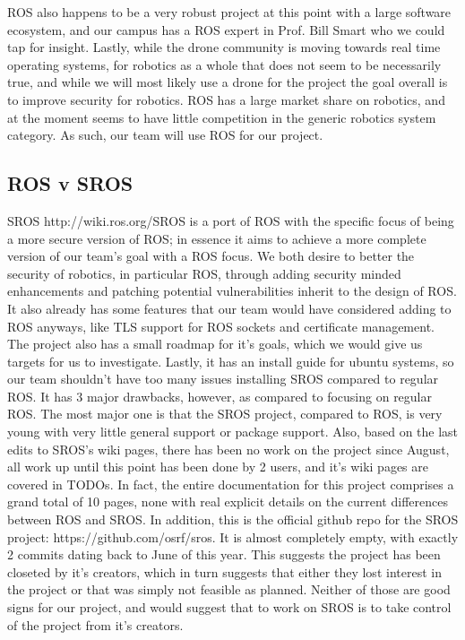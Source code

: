 \documentclass[IEEEtran,letterpaper,10pt,titlepage,draftclsnofoot,onecolumn]{article}
\begin{document}
ROS also happens to be a very robust project at this point with a large software ecosystem, and our campus has a ROS expert in Prof. Bill Smart who we could tap for insight. 
Lastly, while the drone community is moving towards real time operating systems, for robotics as a whole that does not seem to be necessarily true, and while we will most likely use a drone for the project the goal overall is to improve security for robotics. 
ROS has a large market share on robotics, and at the moment seems to have little competition in the generic robotics system category. As such, our team will use ROS for our project.

\subsection*{ROS v SROS}
SROS http://wiki.ros.org/SROS is a port of ROS with the specific focus of being a more secure version of ROS; in essence it aims to achieve a more complete version of our team's goal with a ROS focus. 
We both desire to better the security of robotics, in particular ROS, through adding security minded enhancements and patching potential vulnerabilities inherit to the design of ROS. 
It also already has some features that our team would have considered adding to ROS anyways, like TLS support for ROS sockets and certificate management. 
The project also has a small roadmap for it's goals, which we would give us targets for us to investigate. 
Lastly, it has an install guide for ubuntu systems, so our team shouldn't have too many issues installing SROS compared to regular ROS. 
It has 3 major drawbacks, however, as compared to focusing on regular ROS. 
The most major one is that the SROS project, compared to ROS, is very young with very little general support or package support. 
Also, based on the last edits to SROS's wiki pages, there has been no work on the project since August, all work up until this point has been done by 2 users, and it's wiki pages are covered in TODOs. 
In fact, the entire documentation for this project comprises a grand total of 10 pages, none with real explicit details on the current differences between ROS and SROS. 
In addition, this is the official github repo for the SROS project: https://github.com/osrf/sros. 
It is almost completely empty, with exactly 2 commits dating back to June of this year. 
This suggests the project has been closeted by it's creators, which in turn suggests that either they lost interest in the project or that was simply not feasible as planned. 
Neither of those are good signs for our project, and would suggest that to work on SROS is to take control of the project from it's creators. 
\end{document}
